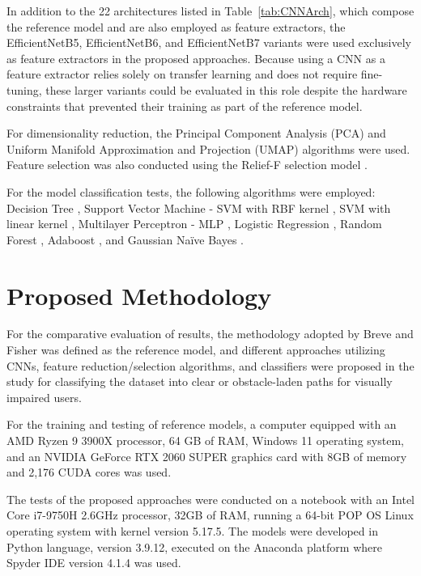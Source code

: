 \documentclass[final,5p,times,twocolumn]{elsarticle}
\begin{document}
In addition to the 22 architectures listed in Table~\ref{tab:CNNArch}, which compose the reference model and are also employed as feature extractors, the EfficientNetB5, EfficientNetB6, and EfficientNetB7 variants \cite{tan2019} were used exclusively as feature extractors in the proposed approaches. Because using a CNN as a feature extractor relies solely on transfer learning and does not require fine-tuning, these larger variants could be evaluated in this role despite the hardware constraints that prevented their training as part of the reference model.

For dimensionality reduction, the Principal Component Analysis (PCA) \cite{jolliffe2002} and Uniform Manifold Approximation and Projection (UMAP) \cite{mcinnes2021} algorithms were used. Feature selection was also conducted using the Relief-F selection model \cite{kononenko1994}.

For the model classification tests, the following algorithms were employed: Decision Tree \cite{priyanka2020}, Support Vector Machine - SVM with RBF kernel \cite{liu2011}, SVM with linear kernel \cite{lorena2003}, Multilayer Perceptron - MLP \cite{pereira2013}, Logistic Regression \cite{ekstrom2018}, Random Forest \cite{breiman2001}, Adaboost \cite{zhu2009}, and Gaussian Naïve Bayes \cite{gayathri2016}.

\section{Proposed Methodology}

For the comparative evaluation of results, the methodology adopted by Breve and Fisher \cite{breve2020} was defined as the reference model, and different approaches utilizing CNNs, feature reduction/selection algorithms, and classifiers were proposed in the study for classifying the dataset into clear or obstacle-laden paths for visually impaired users.

For the training and testing of reference models, a computer equipped with an AMD Ryzen 9 3900X processor, 64 GB of RAM, Windows 11 operating system, and an NVIDIA GeForce RTX 2060 SUPER graphics card with 8GB of memory and 2,176 CUDA cores was used.

The tests of the proposed approaches were conducted on a notebook with an Intel Core i7-9750H 2.6GHz processor, 32GB of RAM, running a 64-bit POP OS Linux operating system with kernel version 5.17.5. The models were developed in Python language, version 3.9.12, executed on the Anaconda platform where Spyder IDE version 4.1.4 was used.
\end{document}
